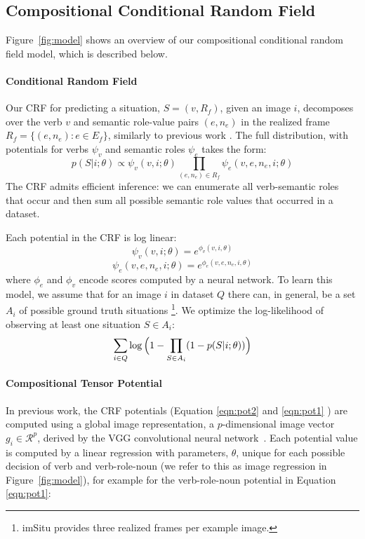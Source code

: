 \documentclass[10pt,twocolumn,letterpaper]{article}
\begin{document}
\subsection{Compositional Conditional Random Field}

Figure~\ref{fig:model} shows an overview of our compositional conditional random field model, which is described below.

\paragraph{Conditional Random Field} Our CRF for predicting a situation, $S = (v,R_f)$, given an image $i$, decomposes over the verb $v$ and semantic role-value pairs $(e,n_e)$ in the realized frame $R_f = \{(e, n_e) : e \in E_f\}$, similarly to previous work \cite{yatskar2016}. 
The full distribution, with potentials for verbs $\psi_v$ and semantic roles $\psi_e$ takes the form:
\begin{equation}
p(S |i; \theta) \propto \psi_v(v,i; \theta)\prod_{(e,n_e) \in R_f} \psi_e(v,e,n_e,i; \theta)
\label{eqn:crf_pot}
\end{equation}
The CRF admits efficient inference: we can enumerate all verb-semantic roles that occur and then sum all possible semantic role values that occurred in a dataset. 


Each potential in the CRF is log linear:
\begin{equation}
\psi_v(v,i; \theta) = e^{\phi_v(v,i,\theta)}
\label{eqn:pot2}
\end{equation}
\begin{equation}
\psi_e(v,e,n_e,i; \theta) = e^{\phi_e(v,e,n_e,i,\theta)}
\label{eqn:pot1}
\end{equation}
where $\phi_e$ and $\phi_v$ encode scores computed by a neural network.
To learn this model, we assume that for an image $i$ in dataset $Q$ there can, in general, be a set $A_i$ of possible ground truth situations \footnote{imSitu provides three realized frames per example image.}.
We optimize the log-likelihood of observing at least one situation $S \in A_i$:
\begin{equation}
\sum_{i \in Q} \log\Big( 1 - \prod_{S \in A_i}(1-p(S|i;\theta))\Big)
\label{eqn:crf_objective}
\vspace{-10pt}
\end{equation}




\paragraph{Compositional Tensor Potential}
In previous work, the CRF potentials (Equation \ref{eqn:pot2} and \ref{eqn:pot1} ) are computed using a global image representation, a $p$-dimensional image vector $g_i \in \mathcal{R}^{p}$, derived by the VGG convolutional neural network~\cite{vgg}.
Each potential value is computed by a linear regression with parameters, $\theta$, unique for each possible decision of verb and verb-role-noun (we refer to this as image regression in Figure~\ref{fig:model}), for example for the verb-role-noun potential in Equation \ref{eqn:pot1}:
\end{document}
